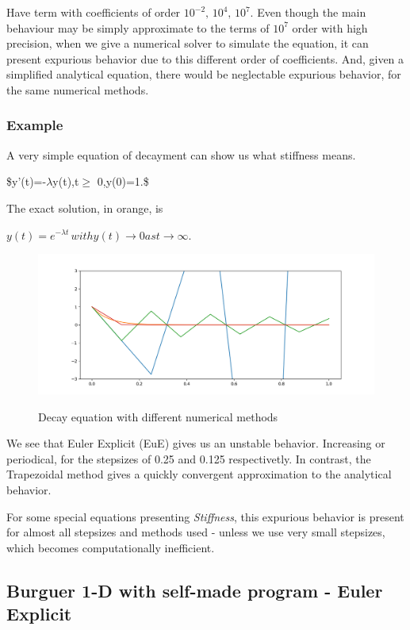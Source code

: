 \documentclass[11pt]{article}
\begin{document}
Have term with coefficients of order \(10^{-2},\,10^{4},\,10^{7}\). Even though
the main behaviour may be simply approximate to the terms of \(10^{7}\) order with
high precision, when we give a numerical solver to simulate the equation, it can
present expurious behavior due to this different order of coefficients. And,
given a simplified analytical equation, there would be neglectable expurious
behavior, for the same numerical methods.

\subsubsection{Example}
\label{sec:orgc19e7d9}
A very simple equation of decayment can show us what stiffness means.

\$y'(t)=-\(\lambda\)y(t),\quad t\(\ge\) 0,y(0)=1.\$

The exact solution, in orange, is

\(y(t)=e^{-\lambda{}t}\, with y(t)\to 0 as t\to \infty\).

\begin{figure}[!htb]
  \centering
  \caption{\label{fig:burguer-square} Decay equation with different numerical methods}
  \includegraphics[width=0.70\linewidth]{Resources/img/Figure_2.png}
  \\  
\end{figure}

We see that Euler Explicit (EuE) gives us an unstable behavior. Increasing or
periodical, for the stepsizes of 0.25 and 0.125 respectivetly. In contrast, the
Trapezoidal method gives a quickly convergent approximation to the analytical
behavior.

For some special equations presenting \emph{Stiffness}, this expurious behavior is
present for almost all stepsizes and methods used - unless we use very small
stepsizes, which becomes computationally inefficient.

\subsection{Burguer 1-D with self-made program - Euler Explicit}
\label{sec:org8e946c7}
\end{document}
